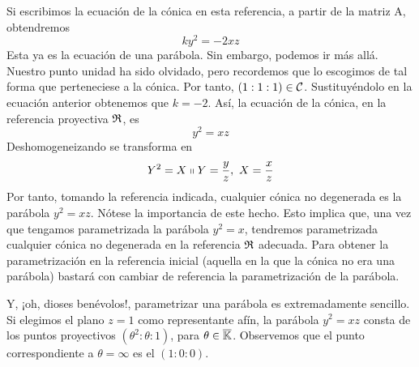 Si escribimos la ecuación de la cónica en esta referencia, a partir de la matriz A, obtendremos
\begin{equation*}
	ky^2=-2xz
\end{equation*}
Esta ya es la ecuación de una parábola. Sin embargo, podemos ir más allá. Nuestro punto unidad ha sido olvidado, pero recordemos que lo escogimos de tal forma que perteneciese a la cónica. Por tanto, $(1:1:1)\in \mathcal{C}$. Sustituyéndolo en la ecuación anterior obtenemos que $k=-2$. Así, la ecuación de la cónica, en la referencia proyectiva $\mathfrak{R}$, es
\begin{equation}
	y^2=xz
\end{equation}
Deshomogeneizando se transforma en 
\begin{equation}
	Y^2=X \shortparallel Y=\frac{y}{z}, \ X=\frac{x}{z}
\end{equation}
Por tanto, tomando la referencia indicada, cualquier cónica no degenerada es la parábola $y^2=xz$. Nótese la importancia de este hecho. Esto implica que, una vez que tengamos parametrizada la parábola $y^2=x$, tendremos parametrizada cualquier cónica no degenerada en la referencia $\mathfrak{R}$ adecuada. Para obtener la parametrización en la referencia inicial (aquella en la que la cónica no era una parábola) bastará con cambiar de referencia la parametrización de la parábola.

Y, ¡oh, dioses benévolos!, parametrizar una parábola es extremadamente sencillo. Si elegimos el plano $z=1$ como representante afín, la parábola $y^2=xz$ consta de los puntos proyectivos $(\theta^2:\theta:1)$, para $\theta\in \overline{\mathbb{K}}$. Observemos que el punto correspondiente a $\theta=\infty$ es el $(1:0:0)$.

